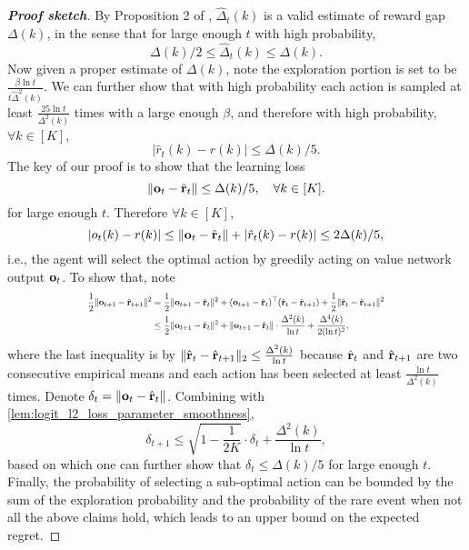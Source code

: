 \begin{proof} [\bf Proof sketch]
		By Proposition 2 of \citet{seldin2017improved}, $\hat{\Delta}_t(k)$ is a valid estimate of reward gap $\Delta(k)$, in the sense that for large enough $t$ with high probability, 
		\begin{equation*}
		    \Delta(k)/2 \le \hat{\Delta}_t(k) \le 	\Delta(k).
		\end{equation*}
		Now given a proper estimate of $\Delta(k)$, note the exploration portion is set to be $\frac{\beta\ln t}{t \hat{\Delta}^2(k)}$.
		We can further show that with high probability each action is sampled at least $\frac{25 \ln t}{\Delta^2(k)}$ times with a large enough $\beta$, and therefore with high probability, $\forall k \in [K]$, 
		\begin{equation*}
		    | \hat{r}_t(k) - r(k) | \le \Delta(k)/5.
		\end{equation*}
		The key of our proof is to show that the learning loss 
		\begin{equation*}
		    \| {\mathbf{o}}_t - \hat{{\mathbf{r}}}_{t}\| \le \Delta(k)/5, \quad \forall k \in [K].
		\end{equation*}
		for large enough $t$. Therefore $\forall k \in [K]$,
		\begin{equation*}
		    | o_t(k) - r(k) | \le \| {\mathbf{o}}_t - \hat{{\mathbf{r}}}_t\| + | \hat{r}_t(k) - r(k) | \le 2\Delta(k)/5,
		\end{equation*}
		i.e., the agent will select the optimal action by greedily acting on value network output ${\mathbf{o}}_t$. To show that, note 
		\begin{equation*}
		\scalemath{0.7}{
		\begin{split}
		\frac{1}{2} \| \rvo_{t+1} - \hat{\rvr}_{t+1}\|^2 &= \frac{1}{2} \| \rvo_{t+1} - \hat{\rvr}_t\|^2 + ( \rvo_{t+1} - \hat{\rvr}_t )^\top ( \hat{\rvr}_t - \hat{\rvr}_{t+1} ) + \frac{1}{2} \| \hat{\rvr}_t - \hat{\rvr}_{t+1} \|^2 \\
		&\le \frac{1}{2} \| \rvo_{t+1} - \hat{\rvr}_t\|^2 + \| \rvo_{t+1} - \hat{\rvr}_t\| \cdot \frac{\Delta^2(k)}{\ln{t}} + \frac{\Delta^4(k)}{2 ( \ln{t} )^2 },
		\end{split}
		}
		\end{equation*}
		where the last inequality is by $\| \hat{{\mathbf{r}}}_t - \hat{{\mathbf{r}}}_{t+1} \|_2 \le \frac{\Delta^2(k)}{\ln{t}}$ because $\hat{{\mathbf{r}}}_t$  and $\hat{{\mathbf{r}}}_{t+1}$ are two consecutive empirical means and each action has been selected at least $\frac{\ln t}{\Delta^2(k)}$ times. Denote $\delta_t = \| {\mathbf{o}}_t - \hat{{\mathbf{r}}}_{t}\|$. Combining with \cref{lem:logit_l2_loss_parameter_smoothness},
		\begin{equation*}
		    \delta_{t+1} \le \sqrt{1 - \frac{1}{2 K} } \cdot \delta_{t} + \frac{\Delta^2(k)}{\ln{t}},
		\end{equation*}
		based on which one can further show that $\delta_t \le \Delta(k) / 5$ for large enough $t$. Finally, the probability of selecting a sub-optimal action can be bounded by the sum of the exploration probability and the probability of the rare event when not all the above claims hold, which leads to an upper bound on the expected regret.
		\end{proof}
